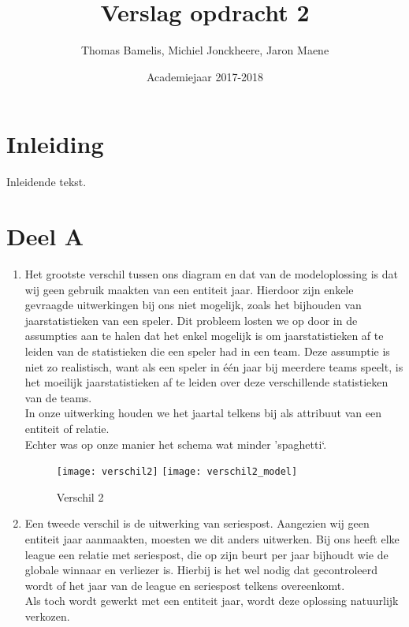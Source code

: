 \documentclass[a4paper,kulak]{kulakarticle}
\date{Academiejaar 2017-2018}
\title{Verslag opdracht 2}
\author{Thomas Bamelis, Michiel Jonckheere, Jaron Maene}
\begin{document}
\maketitle

\section*{Inleiding}

Inleidende tekst.

\section{Deel A}
\begin{enumerate}
		\begin{figure}[!htb]
			\centering
			\texttt{[image: verschil1\_model]}
			\caption{Verschil 1}
			\label{fig:verschil1}
		\end{figure}
	\item Het grootste verschil tussen ons diagram en dat van de modeloplossing is dat wij geen gebruik maakten van een entiteit jaar. Hierdoor zijn enkele gevraagde uitwerkingen bij ons niet mogelijk, zoals het bijhouden van jaarstatistieken van een speler. Dit probleem losten we op door in de assumpties aan te halen dat het enkel mogelijk is om jaarstatistieken af te leiden van de statistieken die een speler had in een team. Deze assumptie is niet zo realistisch, want als een speler in één jaar bij meerdere teams speelt, is het moeilijk jaarstatistieken af te leiden over deze verschillende statistieken van de teams.\\
	In onze uitwerking houden we het jaartal telkens bij als attribuut van een entiteit of relatie. \\
	Echter was op onze manier het schema wat minder 'spaghetti`.
	
		\begin{figure}[!htb]
			\centering
			\texttt{[image: verschil2]}
			\texttt{[image: verschil2\_model]}
			\caption{Verschil 2}
			\label{fig:verschil2}
		\end{figure}
	\item Een tweede verschil is de uitwerking van seriespost. Aangezien wij geen entiteit jaar aanmaakten, moesten we dit anders uitwerken. Bij ons heeft elke league een relatie met seriespost, die op zijn beurt per jaar bijhoudt wie de globale winnaar en verliezer is. Hierbij is het wel nodig dat gecontroleerd wordt of het jaar van de league en seriespost telkens overeenkomt. \\
	Als toch wordt gewerkt met een entiteit jaar, wordt deze oplossing natuurlijk verkozen.
	

\end{enumerate}
\end{document}
